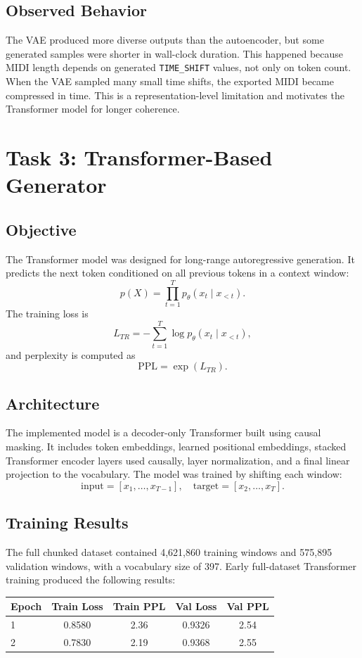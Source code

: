 \documentclass{article}
\begin{document}
\subsection{Observed Behavior}
The VAE produced more diverse outputs than the autoencoder, but some generated samples were shorter in wall-clock duration. This happened because MIDI length depends on generated \texttt{TIME\_SHIFT} values, not only on token count. When the VAE sampled many small time shifts, the exported MIDI became compressed in time. This is a representation-level limitation and motivates the Transformer model for longer coherence.

\section{Task 3: Transformer-Based Generator}

\subsection{Objective}
The Transformer model was designed for long-range autoregressive generation. It predicts the next token conditioned on all previous tokens in a context window:
\[
p(X) = \prod_{t=1}^{T} p_{\theta}(x_t \mid x_{<t}).
\]
The training loss is
\[
L_{TR} = -\sum_{t=1}^{T} \log p_{\theta}(x_t \mid x_{<t}),
\]
and perplexity is computed as
\[
\mathrm{PPL} = \exp(L_{TR}).
\]

\subsection{Architecture}
The implemented model is a decoder-only Transformer built using causal masking. It includes token embeddings, learned positional embeddings, stacked Transformer encoder layers used causally, layer normalization, and a final linear projection to the vocabulary. The model was trained by shifting each window:
\[
\text{input} = [x_1, \ldots, x_{T-1}], \quad
\text{target} = [x_2, \ldots, x_T].
\]

\subsection{Training Results}
The full chunked dataset contained 4,621,860 training windows and 575,895 validation windows, with a vocabulary size of 397. Early full-dataset Transformer training produced the following results:

\begin{center}
\begin{tabular}{lcccc}
\toprule
Epoch & Train Loss & Train PPL & Val Loss & Val PPL \\
\midrule
1 & 0.8580 & 2.36 & 0.9326 & 2.54 \\
2 & 0.7830 & 2.19 & 0.9368 & 2.55 \\
\bottomrule
\end{tabular}
\end{center}
\end{document}
